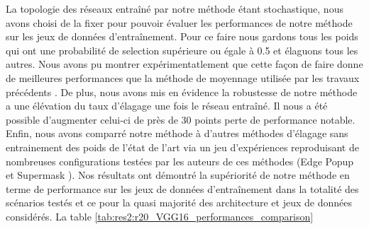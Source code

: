 La topologie des réseaux  entraîné par notre méthode étant stochastique, nous
avons choisi de la fixer pour pouvoir évaluer les performances de notre méthode
sur les jeux de données d'entraînement. Pour ce faire nous gardons tous les
poids qui ont une probabilité de selection supérieure ou égale à 0.5 et élaguons
tous les autres. Nous avons pu montrer expérimentatlement que cette façon de
faire donne de meilleures performances que la méthode de moyennage utilisée par
les travaux précédents \cite{DBLP:conf/nips/ZhouLLY19}. De plus, nous avons mis
en évidence la robustesse de notre méthode a une élévation du taux d'élagage une
fois le réseau entraîné. Il nous a été possible d'augmenter celui-ci de près de
30 points perte de performance notable.\\

Enfin, nous avons comparré notre méthode à d'autres méthodes d'élagage sans
entrainement des poids de l'état de l'art via un jeu d'expériences reproduisant
de nombreuses configurations testées par les auteurs de ces méthodes (Edge Popup
\cite{DBLP:conf/cvpr/RamanujanWKFR20} et Supermask
\cite{DBLP:conf/nips/ZhouLLY19}). Nos résultats ont démontré la supériorité de
notre méthode en terme de performance sur les jeux de données d'entraînement
dans la totalité des scénarios testés et ce pour la quasi majorité des
architecture et jeux de données considérés. La table \cref{tab:res2:r20_VGG16_performances_comparison}\\

